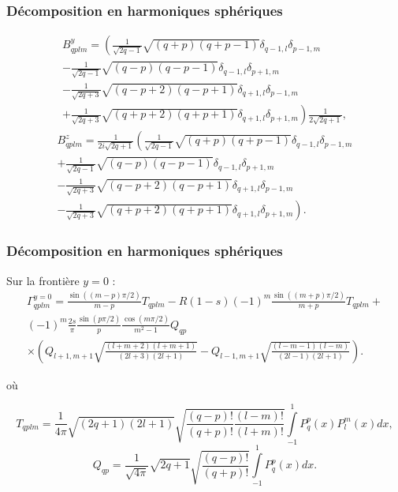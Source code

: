 \begin{frame}
\frametitle{Décomposition en harmoniques sphériques}
\begin{multline*}
B^y_{qplm}=\left(\frac{1}{\sqrt{2q-1}}\sqrt{(q+p)(q+p-1)}\delta_{q-1,l}\delta_{p-1,m}\right.\\
-\frac{1}{\sqrt{2q-1}}\sqrt{(q-p)(q-p-1)}\delta_{q-1,l}\delta_{p+1,m}\\
-\frac{1}{\sqrt{2q+3}}\sqrt{(q-p+2)(q-p+1)}\delta_{q+1,l}\delta_{p-1,m}\\
\left.+\frac{1}{\sqrt{2q+3}}\sqrt{(q+p+2)(q+p+1)}\delta_{q+1,l}\delta_{p+1,m}\right)\frac{1}{2\sqrt{2q+1}},
\end{multline*}
\begin{multline*}
B^z_{qplm}=\frac{1}{2i\sqrt{2q+1}}\left(\frac{1}{\sqrt{2q-1}}\sqrt{(q+p)(q+p-1)}\delta_{q-1,l}\delta_{p-1,m}\right.\\
+\frac{1}{\sqrt{2q-1}}\sqrt{(q-p)(q-p-1)}\delta_{q-1,l}\delta_{p+1,m}\\
-\frac{1}{\sqrt{2q+3}}\sqrt{(q-p+2)(q-p+1)}\delta_{q+1,l}\delta_{p-1,m}\\
\left.-\frac{1}{\sqrt{2q+3}}\sqrt{(q+p+2)(q+p+1)}\delta_{q+1,l}\delta_{p+1,m}\right).
\end{multline*}
\end{frame}
\begin{frame}
\frametitle{Décomposition en harmoniques sphériques}
Sur la frontière $y=0$ :
\begin{multline*}
\Gamma^{y=0}_{qplm}=\frac{\sin{\left((m-p)\pi/2\right)}}{m-p}T_{qplm}-R(1-s)(-1)^m\frac{\sin{((m+p)\pi/2)}}{m+p}T_{qplm}+\\
(-1)^m\frac{2s}{\pi}\frac{\sin{(p\pi/2)}}{p}\frac{\cos{(m\pi/2)}}{m^2-1}Q_{qp}\\
\times\left(Q_{l+1,m+1}\sqrt{\frac{(l+m+2)(l+m+1)}{(2l+3)(2l+1)}}-Q_{l-1,m+1}\sqrt{\frac{(l-m-1)(l-m)}{(2l-1)(2l+1)}}\right).
\end{multline*}

où

\begin{equation*}
T_{qplm}=\frac{1}{4\pi}\sqrt{(2q+1)(2l+1)}\sqrt{\frac{(q-p)!}{(q+p)!}\frac{(l-m)!}{(l+m)!}}\int\limits_{-1}^1P^p_q(x)P^m_l(x)dx,
\end{equation*}
\begin{equation*}
Q_{qp}=\frac{1}{\sqrt{4\pi}}\sqrt{2q+1}\sqrt{\frac{(q-p)!}{(q+p)!}}\int\limits_{-1}^1P^p_q(x)dx.
\end{equation*}
\end{frame}

